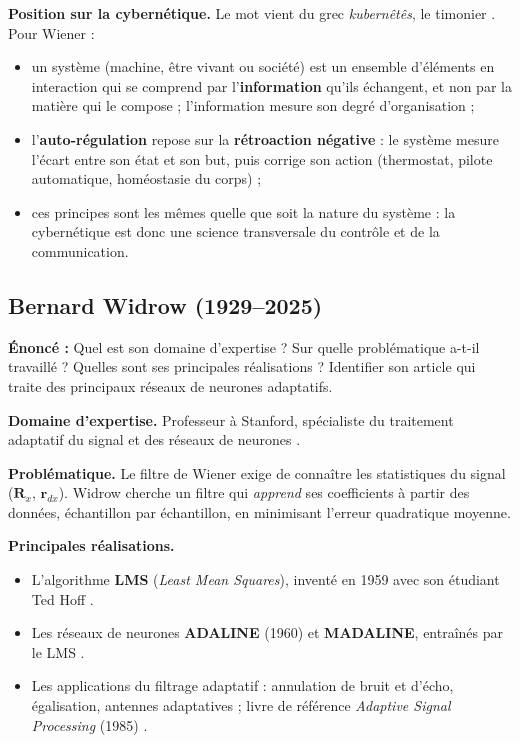 \textbf{Position sur la cybernétique.} Le mot vient du grec \emph{kubernêtês}, le timonier \cite{monoskop}. Pour Wiener :
\begin{itemize}
  \item un système (machine, être vivant ou société) est un ensemble d'éléments en interaction qui se comprend par l'\textbf{information} qu'ils échangent, et non par la matière qui le compose ; l'information mesure son degré d'organisation ;
  \item l'\textbf{auto-régulation} repose sur la \textbf{rétroaction négative} : le système mesure l'écart entre son état et son but, puis corrige son action (thermostat, pilote automatique, homéostasie du corps) ;
  \item ces principes sont les mêmes quelle que soit la nature du système : la cybernétique est donc une science transversale du contrôle et de la communication.
\end{itemize}

\subsection{Bernard Widrow (1929--2025)}

\begin{enonce}
\textbf{Énoncé :} Quel est son domaine d'expertise ? Sur quelle problématique a-t-il travaillé ? Quelles sont ses principales réalisations ? Identifier son article qui traite des principaux réseaux de neurones adaptatifs.
\end{enonce}

\textbf{Domaine d'expertise.} Professeur à Stanford, spécialiste du traitement adaptatif du signal et des réseaux de neurones \cite{ethw_widrow}.

\textbf{Problématique.} Le filtre de Wiener exige de connaître les statistiques du signal ($\mathbf{R}_x$, $\mathbf{r}_{dx}$). Widrow cherche un filtre qui \emph{apprend} ses coefficients à partir des données, échantillon par échantillon, en minimisant l'erreur quadratique moyenne.

\textbf{Principales réalisations.}
\begin{itemize}
  \item L'algorithme \textbf{LMS} (\emph{Least Mean Squares}), inventé en 1959 avec son étudiant Ted Hoff \cite{chm_widrow}.
  \item Les réseaux de neurones \textbf{ADALINE} (1960) et \textbf{MADALINE}, entraînés par le LMS \cite{stanford_obit}.
  \item Les applications du filtrage adaptatif : annulation de bruit et d'écho, égalisation, antennes adaptatives \cite{ethw_widrow} ; livre de référence \emph{Adaptive Signal Processing} (1985) \cite{widrowstearns}.
\end{itemize}

